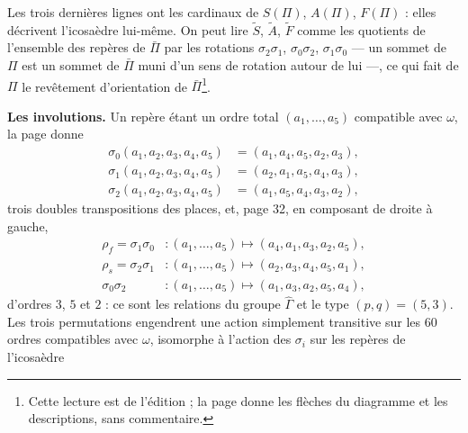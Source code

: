 \documentclass[11pt,a4paper]{article}
\begin{document}
 Les trois dernières lignes ont les cardinaux de $S(\Pi)$,
$A(\Pi)$, $F(\Pi)$ : elles décrivent l'icosaèdre lui-même. On peut lire
$\tilde S$, $\tilde A$, $\tilde F$ comme les quotients de l'ensemble des
repères de $\bar\Pi$ par les rotations $\sigma_2\sigma_1$, $\sigma_0\sigma_2$,
$\sigma_1\sigma_0$ --- un sommet de $\Pi$ est un sommet de $\bar\Pi$ muni d'un
sens de rotation autour de lui ---, ce qui fait de $\Pi$ le revêtement
d'orientation de $\bar\Pi$\footnote{Cette lecture est de l'édition ; la page
donne les flèches du diagramme et les descriptions, sans commentaire.}.

\textbf{Les involutions.} Un repère étant un ordre total $(a_1, \ldots, a_5)$
compatible avec $\omega$, la page donne
\[
\begin{aligned}
\sigma_0(a_1, a_2, a_3, a_4, a_5) &= (a_1, a_4, a_5, a_2, a_3), \\
\sigma_1(a_1, a_2, a_3, a_4, a_5) &= (a_2, a_1, a_5, a_4, a_3), \\
\sigma_2(a_1, a_2, a_3, a_4, a_5) &= (a_1, a_5, a_4, a_3, a_2),
\end{aligned}
\]
trois doubles transpositions des places, et, page 32, en composant de droite à
gauche,
\[
\begin{aligned}
\rho_f = \sigma_1\sigma_0 &: (a_1, \ldots, a_5) \mapsto (a_4, a_1, a_3, a_2, a_5), \\
\rho_s = \sigma_2\sigma_1 &: (a_1, \ldots, a_5) \mapsto (a_2, a_3, a_4, a_5, a_1), \\
\sigma_0\sigma_2 &: (a_1, \ldots, a_5) \mapsto (a_1, a_3, a_2, a_5, a_4),
\end{aligned}
\]
d'ordres $3$, $5$ et $2$ : ce sont les relations du groupe $\widehat{\Gamma}$
et le type $(p, q) = (5, 3)$. Les trois permutations engendrent une action
simplement transitive sur les $60$ ordres compatibles avec $\omega$, isomorphe
à l'action des $\sigma_i$ sur les repères de l'icosaèdre
\end{document}
